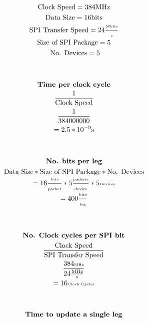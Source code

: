    			\begin{figure}[!t]
     		\begin{minipage}{0.5\textwidth}
    			\begin{gather*}
    		    	\text{Clock Speed} = 384 \text{MHz}\\
       		    	\text{Data Size} = 16 \text{bits}\\
       		    	\text{SPI Transfer Speed} = 24 \tiny{\frac{\text{Mbits}}{\text{s}}}\\
       		    	\text{Size of SPI Package}= 5\\
       		    	\text{ No. Devices} = 5\\
       		    	\\
       		    	\\
       		    	\textbf{Time per clock cycle}\\
       		    	\frac{1}{\text{Clock Speed}}\\
       			    \frac{1}{384000000}\\
       			     = 2.5*10^{-9}\text{s}\\
       			     \\
       			     \\
       		    	\textbf{No. bits per leg}\\
    				\text{Data Size} * \text{Size of SPI Package} * \text{No. Devices}\\
    				= 16 \tiny{\frac{\text{bits}}{\tiny{\text{packet}}}} * 5\frac{\text{packets}}{\text{device}} * 5\text{Devices} \\
    				= 400 \tiny{\frac{\text{bits}}{\text{leg}}}\\
    				\\
    				\\
    			\end{gather*} 
			\end{minipage}
			\begin{minipage}{0.5\textwidth}
    			\begin{gather*} 
    				\textbf{No. Clock cycles per SPI bit}\\
    				\frac{\text{Clock Speed}}{\text{SPI	Transfer Speed}}\\
    				\tiny{\frac{384\text{MHz}}{24\frac{\text{MHz}}{\text{s}}}}\\ 
    				 =16\tiny{\text{Clock Cycles}}\\
    		    	\\
    		    	\\
    		    	\textbf{Time to update a single leg}\\

\end{gather*}
\end{minipage}
\end{figure}
